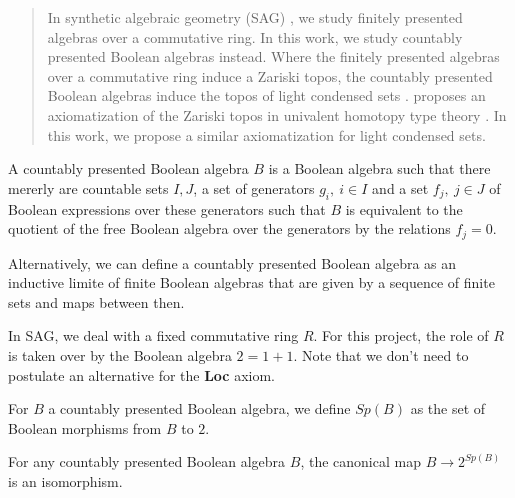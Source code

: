 \begin{abstract}
In synthetic algebraic geometry (SAG) \cite{draft}, we study finitely presented algebras over a commutative ring. 
In this work, we study countably presented Boolean algebras instead. 
Where the finitely presented algebras over a commutative ring induce a Zariski topos, 
the countably presented Boolean algebras induce the topos of light condensed sets \cite{TODO}. 
\cite{draft} proposes an axiomatization of the Zariski topos in univalent homotopy type theory \cite{HoTT}. 
In this work, we propose a similar axiomatization for light condensed sets. 
\end{abstract} 

\begin{definition}
  A countably presented Boolean algebra $B$ is a Boolean algebra such that there mererly are countable sets $I,J$, 
  a set of generators $g_i,~{i\in I}$ and a set $f_j,~{j\in J}$ of Boolean expressions over these generators 
  such that $B$ is equivalent to the quotient of the free Boolean algebra over the generators by the relations
  $f_j=0$.
\end{definition} 

Alternatively, we can define a countably presented Boolean algebra as an inductive limite of finite Boolean algebras
that are given by a sequence of finite sets and maps between then.

 \medskip

In SAG, we deal with a fixed commutative ring $R$. For this project, the role of $R$ is taken over by 
the Boolean algebra $2 = 1+1$. Note that we don't need to postulate an alternative for the \textbf{Loc} axiom. 


\begin{definition}
  For $B$ a countably presented Boolean algebra, we define $Sp(B)$ as the set of Boolean morphisms from $B$ to $2$. 
\end{definition}

\begin{axiom}
  For any countably presented Boolean algebra $B$, the canonical map   $B\rightarrow  2^{Sp(B)}$ is an isomorphism.
\end{axiom} 

